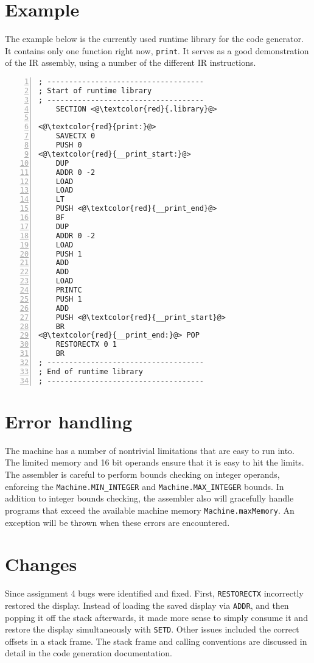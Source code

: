 \documentclass[oneside]{amsart}
\theoremstyle{definition}
\theoremstyle{remark}
\numberwithin{equation}{section}
\begin{document}
\section{Example}
The example below is the currently used runtime library for the code generator. It contains only
one function right now, \texttt{print}. It serves as a good demonstration of the IR assembly, using
a number of the different IR instructions.
\begin{lstlisting}[numbers=left]
; ------------------------------------
; Start of runtime library
; ------------------------------------
    SECTION <@\textcolor{red}{.library}@>

<@\textcolor{red}{print:}@>
    SAVECTX 0
    PUSH 0
<@\textcolor{red}{__print_start:}@>
    DUP
    ADDR 0 -2
    LOAD
    LOAD
    LT
    PUSH <@\textcolor{red}{__print_end}@>
    BF
    DUP
    ADDR 0 -2
    LOAD
    PUSH 1
    ADD
    ADD
    LOAD
    PRINTC
    PUSH 1
    ADD
    PUSH <@\textcolor{red}{__print_start}@>
    BR
<@\textcolor{red}{__print_end:}@> POP
    RESTORECTX 0 1
    BR
; ------------------------------------
; End of runtime library
; ------------------------------------
\end{lstlisting}

\section{Error handling}
The machine has a number of nontrivial limitations that are easy to run into. The limited memory
and 16 bit operands ensure that it is easy to hit the limits. The assembler is careful to perform
bounds checking on integer operands, enforcing the \texttt{Machine.MIN_INTEGER} and
\texttt{Machine.MAX_INTEGER} bounds. In addition to integer bounds checking, the assembler also will
gracefully handle programs that exceed the available machine memory \texttt{Machine.maxMemory}. An
exception will be thrown when these errors are encountered.

\section{Changes}
Since assignment 4 bugs were identified and fixed. First, \texttt{RESTORECTX} incorrectly restored
the display. Instead of loading the saved display via \texttt{ADDR}, and then popping it off the
stack afterwards, it made more sense to simply consume it and restore the display simultaneously
with \texttt{SETD}. Other issues included the correct offsets in a stack frame. The stack frame
and calling conventions are discussed in detail in the code generation documentation.
\end{document}
